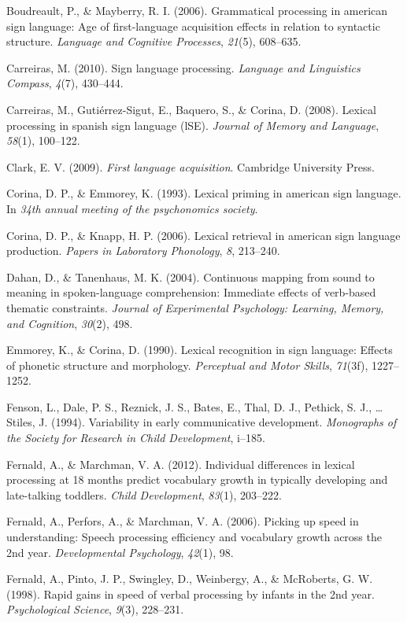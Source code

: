 \documentclass[12pt,]{article}
\begin{document}
Boudreault, P., \& Mayberry, R. I. (2006). Grammatical processing in
american sign language: Age of first-language acquisition effects in
relation to syntactic structure. \emph{Language and Cognitive
Processes}, \emph{21}(5), 608--635.

Carreiras, M. (2010). Sign language processing. \emph{Language and
Linguistics Compass}, \emph{4}(7), 430--444.

Carreiras, M., Guti{é}rrez-Sigut, E., Baquero, S., \& Corina, D. (2008).
Lexical processing in spanish sign language (lSE). \emph{Journal of
Memory and Language}, \emph{58}(1), 100--122.

Clark, E. V. (2009). \emph{First language acquisition}. Cambridge
University Press.

Corina, D. P., \& Emmorey, K. (1993). Lexical priming in american sign
language. In \emph{34th annual meeting of the psychonomics society}.

Corina, D. P., \& Knapp, H. P. (2006). Lexical retrieval in american
sign language production. \emph{Papers in Laboratory Phonology},
\emph{8}, 213--240.

Dahan, D., \& Tanenhaus, M. K. (2004). Continuous mapping from sound to
meaning in spoken-language comprehension: Immediate effects of
verb-based thematic constraints. \emph{Journal of Experimental
Psychology: Learning, Memory, and Cognition}, \emph{30}(2), 498.

Emmorey, K., \& Corina, D. (1990). Lexical recognition in sign language:
Effects of phonetic structure and morphology. \emph{Perceptual and Motor
Skills}, \emph{71}(3f), 1227--1252.

Fenson, L., Dale, P. S., Reznick, J. S., Bates, E., Thal, D. J.,
Pethick, S. J., \ldots{} Stiles, J. (1994). Variability in early
communicative development. \emph{Monographs of the Society for Research
in Child Development}, i--185.

Fernald, A., \& Marchman, V. A. (2012). Individual differences in
lexical processing at 18 months predict vocabulary growth in typically
developing and late-talking toddlers. \emph{Child Development},
\emph{83}(1), 203--222.

Fernald, A., Perfors, A., \& Marchman, V. A. (2006). Picking up speed in
understanding: Speech processing efficiency and vocabulary growth across
the 2nd year. \emph{Developmental Psychology}, \emph{42}(1), 98.

Fernald, A., Pinto, J. P., Swingley, D., Weinbergy, A., \& McRoberts, G.
W. (1998). Rapid gains in speed of verbal processing by infants in the
2nd year. \emph{Psychological Science}, \emph{9}(3), 228--231.
\end{document}
